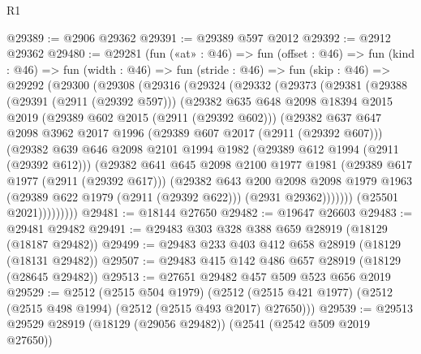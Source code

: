 \begin{lexlean}{R1}
\begin{coremodule}
@29389 := @2906 @29362
@29391 := @29389 @597 @2012
@29392 := @2912 @29362
@29480 := @29281
    (fun («at» : @46) =>
    fun (offset : @46) =>
    fun (kind : @46) =>
    fun (width : @46) =>
    fun (stride : @46) =>
    fun (skip : @46) =>
    @29292
      (@29300
        (@29308
          (@29316
            (@29324
              (@29332
                (@29373
                  (@29381
                    (@29388
                      (@29391 (@2911 (@29392 @597)))
                      (@29382
                        @635
                        @648
                        @2098
                        @18394
                        @2015
                        @2019
                        (@29389 @602 @2015 (@2911 (@29392 @602)))
                        (@29382
                          @637
                          @647
                          @2098
                          @3962
                          @2017
                          @1996
                          (@29389 @607 @2017 (@2911 (@29392 @607)))
                          (@29382
                            @639
                            @646
                            @2098
                            @2101
                            @1994
                            @1982
                            (@29389 @612 @1994 (@2911 (@29392 @612)))
                            (@29382
                              @641
                              @645
                              @2098
                              @2100
                              @1977
                              @1981
                              (@29389 @617 @1977 (@2911 (@29392 @617)))
                              (@29382
                                @643
                                @200
                                @2098
                                @2098
                                @1979
                                @1963
                                (@29389 @622 @1979 (@2911 (@29392 @622)))
                                (@2931 @29362)))))))
                    (@25501 @2021)))))))))
@29481 := @18144 @27650
@29482 := @19647 @26603
@29483 := @29481 @29482
@29491 := @29483 @303 @328 @388 @659 @28919 (@18129 (@18187 @29482))
@29499 := @29483 @233 @403 @412 @658 @28919 (@18129 (@18131 @29482))
@29507 := @29483 @415 @142 @486 @657 @28919 (@18129 (@28645 @29482))
@29513 := @27651 @29482 @457 @509 @523 @656 @2019
@29529 := @2512
    (@2515 @504 @1979)
    (@2512 (@2515 @421 @1977) (@2512 (@2515 @498 @1994) (@2512 (@2515 @493 @2017) @27650)))
@29539 := @29513 @29529 @28919 (@18129 (@29056 @29482)) (@2541 (@2542 @509 @2019 @27650))

\end{coremodule}
\end{lexlean}
